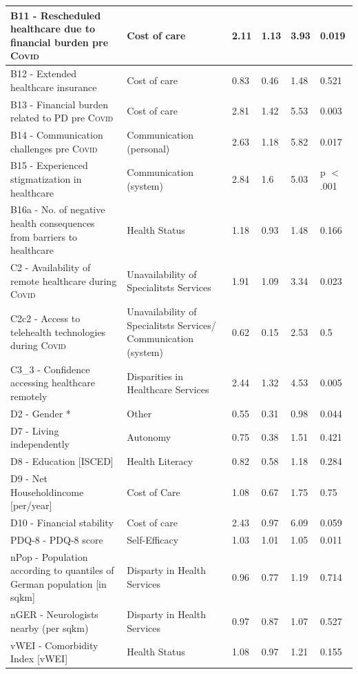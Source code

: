 \documentclass[a4paper,oneside,11pt,english]{scrartcl}
\begin{document}
\begin{longtable}[ht!]{|p{5.5cm} | p{3.5cm} | p{1cm} | l | l | p{1.5cm} |}
	B11 - Rescheduled healthcare due to financial burden pre \textsc{Covid} & Cost of care & 2.11 & 1.13 & 3.93 & 0.019 \\ \hline
	B12 - Extended healthcare insurance & Cost of care & 0.83 & 0.46 & 1.48 & 0.521 \\ \hline
	B13 - Financial burden related to \textsc{PD} pre \textsc{Covid} & Cost of care & 2.81 & 1.42 & 5.53 & 0.003 \\ \hline
	B14 - Communication challenges pre \textsc{Covid} & Communication (personal) & 2.63 & 1.18 & 5.82 & 0.017 \\ \hline
	B15 - Experienced stigmatization in healthcare & Communication (system) & 2.84 & 1.6 & 5.03 & p $<$ .001 \\ \hline
	B16a - No. of negative health consequences from barriers to healthcare & Health Status & 1.18 & 0.93 & 1.48 & 0.166 \\ \hline
	C2 - Availability of remote healthcare during \textsc{Covid} & Unavailability of Specialitsts Services & 1.91 & 1.09 & 3.34 & 0.023 \\ \hline
	C2c2 - Access to telehealth technologies during \textsc{Covid} & Unavailability of Specialitsts Services/ Communication (system) & 0.62 & 0.15 & 2.53 & 0.5 \\ \hline
	C3\_3 - Confidence accessing healthcare remotely & Disparities in Healthcare Services & 2.44 & 1.32 & 4.53 & 0.005 \\ \hline
	D2 - Gender * & Other & 0.55 & 0.31 & 0.98 & 0.044 \\ \hline
	D7 - Living independently & Autonomy & 0.75 & 0.38 & 1.51 & 0.421 \\ \hline
	D8 - Education [ISCED] & Health Literacy & 0.82 & 0.58 & 1.18 & 0.284 \\ \hline
	D9 - Net Householdincome [per/year] & Cost of Care & 1.08 & 0.67 & 1.75 & 0.75 \\ \hline
	D10 - Financial stability & Cost of care & 2.43 & 0.97 & 6.09 & 0.059 \\ \hline
	\textsc{PD}Q-8 - \textsc{PD}Q-8 score & Self-Efficacy & 1.03 & 1.01 & 1.05 & 0.011 \\ \hline
	nPop - Population according to quantiles of German population [in sqkm] & Disparty in Health Services & 0.96 & 0.77 & 1.19 & 0.714 \\ \hline
	nGER - Neurologists nearby (per sqkm) & Disparty in Health Services & 0.97 & 0.87 & 1.07 & 0.527 \\ \hline
	vWEI - Comorbidity Index [vWEI] & Health Status & 1.08 & 0.97 & 1.21 & 0.155 \\ \hline
\end{longtable}
\end{document}
